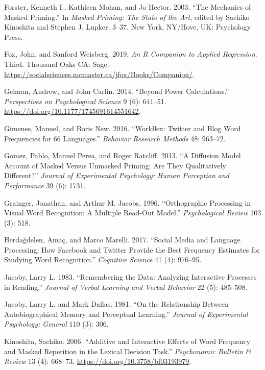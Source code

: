 \documentclass[
]{interact}
\newlength{\cslhangindent}
\newenvironment{CSLReferences}[2] %
 {\begin{list}{}{%
  \setlength{\itemindent}{0pt}
  \setlength{\leftmargin}{0pt}
  \setlength{\parsep}{0pt}
  \ifodd #1
   \setlength{\leftmargin}{\cslhangindent}
   \setlength{\itemindent}{-1\cslhangindent}
  \fi
  \setlength{\itemsep}{#2\baselineskip}}}
 {\end{list}}
\begin{document}
\begin{CSLReferences}{1}{0}
Forster, Kenneth I., Kathleen Mohan, and Jo Hector. 2003. {``The
Mechanics of Masked Priming.''} In \emph{Masked Priming: The State of
the Art}, edited by Sachiko Kinoshita and Stephen J. Lupker, 3--37. New
York, NY/Hove, UK: Psychology Press.

Fox, John, and Sanford Weisberg. 2019. \emph{An {R} Companion to Applied
Regression}. Third. Thousand Oaks {CA}: Sage.
\url{https://socialsciences.mcmaster.ca/jfox/Books/Companion/}.

Gelman, Andrew, and John Carlin. 2014. {``Beyond Power Calculations.''}
\emph{Perspectives on Psychological Science} 9 (6): 641--51.
\url{https://doi.org/10.1177/1745691614551642}.

Gimenes, Manuel, and Boris New. 2016. {``Worldlex: Twitter and Blog Word
Frequencies for 66 Languages.''} \emph{Behavior Research Methods} 48:
963--72.

Gomez, Pablo, Manuel Perea, and Roger Ratcliff. 2013. {``A Diffusion
Model Account of Masked Versus Unmasked Priming: Are They Qualitatively
Different?''} \emph{Journal of Experimental Psychology: Human Perception
and Performance} 39 (6): 1731.

Grainger, Jonathan, and Arthur M. Jacobs. 1996. {``Orthographic
Processing in Visual Word Recognition: A Multiple Read-Out Model.''}
\emph{Psychological Review} 103 (3): 518.

Herdağdelen, Amaç, and Marco Marelli. 2017. {``Social Media and Language
Processing: How Facebook and Twitter Provide the Best Frequency
Estimates for Studying Word Recognition.''} \emph{Cognitive Science} 41
(4): 976--95.

Jacoby, Larry L. 1983. {``Remembering the Data: Analyzing Interactive
Processes in Reading.''} \emph{Journal of Verbal Learning and Verbal
Behavior} 22 (5): 485--508.

Jacoby, Larry L, and Mark Dallas. 1981. {``On the Relationship Between
Autobiographical Memory and Perceptual Learning.''} \emph{Journal of
Experimental Psychology: General} 110 (3): 306.

Kinoshita, Sachiko. 2006. {``Additive and Interactive Effects of Word
Frequency and Masked Repetition in the Lexical Decision Task.''}
\emph{Psychonomic Bulletin \& Review} 13 (4): 668--73.
\url{https://doi.org/10.3758/bf03193979}.


\end{CSLReferences}
\end{document}
